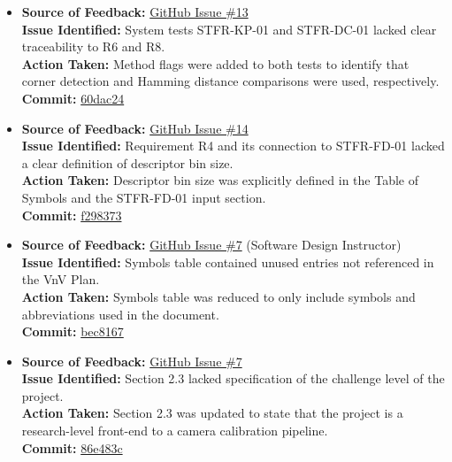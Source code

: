 \documentclass{article}
\begin{document}
\begin{itemize}
  \item \textbf{Source of Feedback:} \href{https://github.com/KiranSingh15/CAS-741-Image-Correspondences/issues/13}{GitHub Issue \#13} \\
  \textbf{Issue Identified:} System tests STFR-KP-01 and STFR-DC-01 lacked clear traceability to R6 and R8. \\
  \textbf{Action Taken:} Method flags were added to both tests to identify that corner detection and Hamming distance comparisons were used, respectively. \\
  \textbf{Commit:} \href{https://github.com/KiranSingh15/CAS-741-Image-Correspondences/commit/60dac24afd7b7a43508db828bf6fd4601f6c0cb3}{60dac24}

  \item \textbf{Source of Feedback:} \href{https://github.com/KiranSingh15/CAS-741-Image-Correspondences/issues/14}{GitHub Issue \#14} \\
  \textbf{Issue Identified:} Requirement R4 and its connection to STFR-FD-01 lacked a clear definition of descriptor bin size. \\
  \textbf{Action Taken:} Descriptor bin size was explicitly defined in the Table of Symbols and the STFR-FD-01 input section. \\
  \textbf{Commit:} \href{https://github.com/KiranSingh15/CAS-741-Image-Correspondences/commit/f2983739f424153f1c0262cef58c2b35e53e4278}{f298373}

  \item \textbf{Source of Feedback:} \href{https://github.com/KiranSingh15/CAS-741-Image-Correspondences/issues/7}{GitHub Issue \#7} (Software Design Instructor) \\
  \textbf{Issue Identified:} Symbols table contained unused entries not referenced in the VnV Plan. \\
  \textbf{Action Taken:} Symbols table was reduced to only include symbols and abbreviations used in the document. \\
  \textbf{Commit:} \href{https://github.com/KiranSingh15/CAS-741-Image-Correspondences/commit/bec8167599e374f06193fd96d8b9e88414cd9e9a}{bec8167}

  \item \textbf{Source of Feedback:} \href{https://github.com/KiranSingh15/CAS-741-Image-Correspondences/issues/7}{GitHub Issue \#7} \\
  \textbf{Issue Identified:} Section 2.3 lacked specification of the challenge level of the project. \\
  \textbf{Action Taken:} Section 2.3 was updated to state that the project is a research-level front-end to a camera calibration pipeline. \\
  \textbf{Commit:} \href{https://github.com/KiranSingh15/CAS-741-Image-Correspondences/blame/0fedd067caa95f2e5951f4f2fe0d66f9eb975188/docs/VnVPlan/VnVPlan.tex}{86e483c}


\end{itemize}
\end{document}
